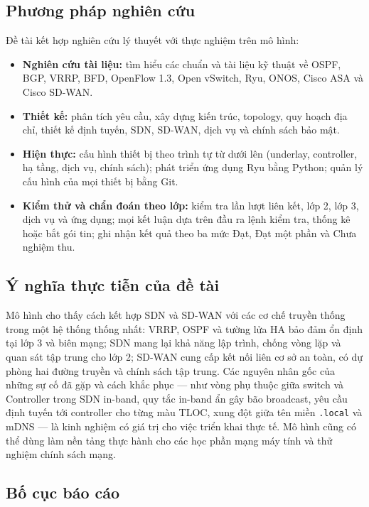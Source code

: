 \subsection{Phương pháp nghiên cứu}

Đề tài kết hợp nghiên cứu lý thuyết với thực nghiệm trên mô hình:
\begin{itemize}
    \item \textbf{Nghiên cứu tài liệu:} tìm hiểu các chuẩn và tài liệu kỹ thuật về OSPF, BGP, VRRP, BFD, OpenFlow 1.3, Open vSwitch, Ryu, ONOS, Cisco ASA và Cisco SD-WAN.
    \item \textbf{Thiết kế:} phân tích yêu cầu, xây dựng kiến trúc, topology, quy hoạch địa chỉ, thiết kế định tuyến, SDN, SD-WAN, dịch vụ và chính sách bảo mật.
    \item \textbf{Hiện thực:} cấu hình thiết bị theo trình tự từ dưới lên (underlay, controller, hạ tầng, dịch vụ, chính sách); phát triển ứng dụng Ryu bằng Python; quản lý cấu hình của mọi thiết bị bằng Git.
    \item \textbf{Kiểm thử và chẩn đoán theo lớp:} kiểm tra lần lượt liên kết, lớp 2, lớp 3, dịch vụ và ứng dụng; mọi kết luận dựa trên đầu ra lệnh kiểm tra, thống kê hoặc bắt gói tin; ghi nhận kết quả theo ba mức Đạt, Đạt một phần và Chưa nghiệm thu.
\end{itemize}

\subsection{Ý nghĩa thực tiễn của đề tài}

Mô hình cho thấy cách kết hợp SDN và SD-WAN với các cơ chế truyền thống trong một hệ thống thống nhất: VRRP, OSPF và tường lửa HA bảo đảm ổn định tại lớp 3 và biên mạng; SDN mang lại khả năng lập trình, chống vòng lặp và quan sát tập trung cho lớp 2; SD-WAN cung cấp kết nối liên cơ sở an toàn, có dự phòng hai đường truyền và chính sách tập trung. Các nguyên nhân gốc của những sự cố đã gặp và cách khắc phục --- như vòng phụ thuộc giữa switch và Controller trong SDN in-band, quy tắc in-band ẩn gây bão broadcast, yêu cầu định tuyến tới controller cho từng màu TLOC, xung đột giữa tên miền \texttt{.local} và mDNS --- là kinh nghiệm có giá trị cho việc triển khai thực tế. Mô hình cũng có thể dùng làm nền tảng thực hành cho các học phần mạng máy tính và thử nghiệm chính sách mạng.

\subsection{Bố cục báo cáo}

